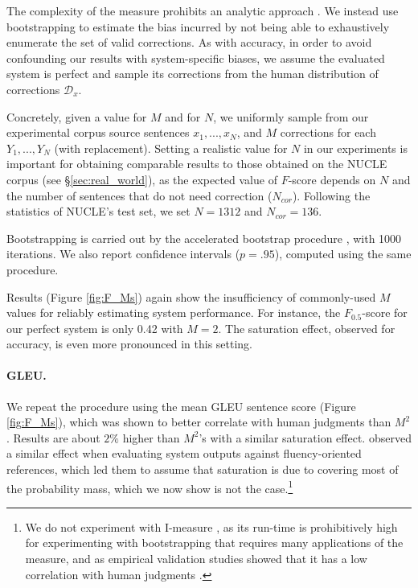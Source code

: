 \documentclass[11pt, a4paper]{article}
\begin{document}
The complexity of the measure prohibits an analytic approach \cite{yeh2000more}.
We instead use bootstrapping to estimate the bias incurred by not being able to exhaustively enumerate the set of valid corrections.
As with accuracy, in order to avoid confounding our results with system-specific biases,
we assume the evaluated system is perfect and sample its corrections from the human distribution of corrections $\mathcal{D}_x$.

Concretely, given a value for $M$ and for $N$, we uniformly sample from our experimental corpus source sentences $x_1,...,x_N$, and $M$ corrections for each $Y_1,...,Y_N$ (with replacement).
Setting a realistic value for $N$ in our experiments is important for obtaining comparable results to those obtained on the NUCLE corpus (see \S\ref{sec:real_world}),
as the expected value of $F$-score depends on $N$ and the number of sentences that do not need correction ($N_{cor}$).
Following the statistics of NUCLE's test set, we set $N=1312$ and $N_{cor}=136$.

Bootstrapping is carried out by the accelerated bootstrap procedure \cite{efron1987better}, with 1000 iterations.
We also report confidence intervals ($p=.95$), computed using the same procedure.%
%

Results (Figure \ref{fig:F_Ms}) again show the insufficiency of commonly-used
$M$ values for reliably estimating system performance.
For instance, the $F_{0.5}$-score for our perfect system is only 0.42 with $M=2$.
The saturation effect, observed for accuracy, is even more pronounced in this setting.

\paragraph{GLEU.} We repeat the procedure using the mean GLEU sentence score (Figure \ref{fig:F_Ms}), 
which was shown to better correlate with human judgments than $M^2$ \cite{napoles-sakaguchi-tetreault:2016:EMNLP2016}.
Results are about $2\%$ higher than $M^2$'s with a similar saturation effect.
\citet{sakaguchi2016reassessing} observed a similar effect when evaluating system outputs against fluency-oriented references,
which led them to assume that saturation is due to covering most of the probability mass,
which we now show is not the case.\footnote{
We do not experiment with I-measure \cite{felice2015towards}, 
as its run-time is prohibitively high for experimenting with bootstrapping
that requires many applications of the measure, and as empirical validation 
studies showed that it has a low correlation with human judgments \cite{sakaguchi2016reassessing, choshen2018maege}.}
\end{document}
